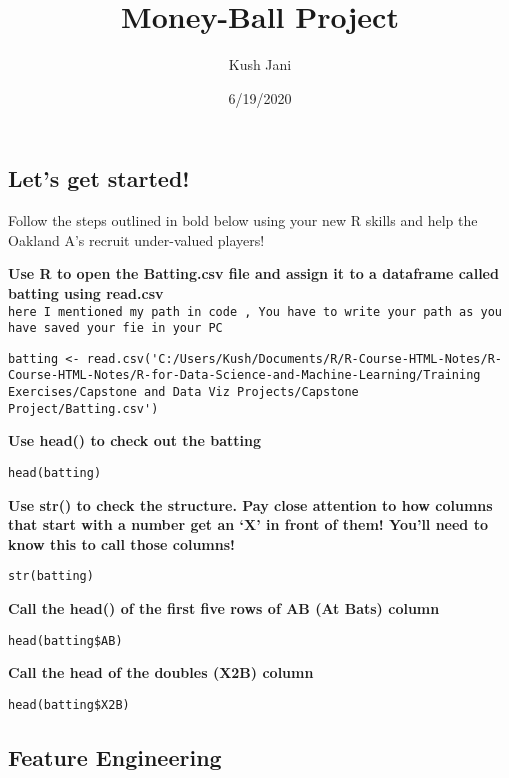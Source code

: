 \documentclass[
]{article}
\title{Money-Ball Project}
\author{Kush Jani}
\date{6/19/2020}
\begin{document}
\maketitle

\hypertarget{lets-get-started}{%
\subsection{Let's get started!}\label{lets-get-started}}

Follow the steps outlined in bold below using your new R skills and help
the Oakland A's recruit under-valued players!

\textbf{Use R to open the Batting.csv file and assign it to a dataframe
called batting using read.csv}
\texttt{here\ I\ mentioned\ my\ path\ in\ code\ ,\ You\ have\ to\ write\ your\ path\ as\ you\ have\ saved\ your\ fie\ in\ your\ PC}

\begin{verbatim}
batting <- read.csv('C:/Users/Kush/Documents/R/R-Course-HTML-Notes/R-Course-HTML-Notes/R-for-Data-Science-and-Machine-Learning/Training Exercises/Capstone and Data Viz Projects/Capstone Project/Batting.csv')
\end{verbatim}

\textbf{Use head() to check out the batting}

\begin{verbatim}
head(batting)
\end{verbatim}

\textbf{Use str() to check the structure. Pay close attention to how
columns that start with a number get an `X' in front of them! You'll
need to know this to call those columns!}

\begin{verbatim}
str(batting)
\end{verbatim}

\textbf{Call the head() of the first five rows of AB (At Bats) column}

\begin{verbatim}
head(batting$AB)
\end{verbatim}

\textbf{Call the head of the doubles (X2B) column}

\begin{verbatim}
head(batting$X2B)
\end{verbatim}

\hypertarget{feature-engineering}{%
\subsection{Feature Engineering}\label{feature-engineering}}
\end{document}
